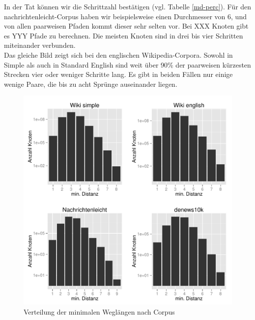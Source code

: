 \documentclass[11pt, a4paper]{article}
\begin{document}
In der Tat können wir die Schrittzahl bestätigen (vgl. Tabelle \ref{md-perc}).
Für den nachrichtenleicht-Corpus haben wir beispielsweise einen Durchmesser von
6, und von %
allen paarweisen Pfaden kommt dieser sehr selten vor. Bei XXX Knoten gibt
es YYY Pfade zu berechnen. Die meisten Knoten sind in drei bis vier Schritten
miteinander verbunden.\\
Das gleiche Bild zeigt sich bei den englischen Wikipedia-Corpora. Sowohl in 
Simple als auch in Standard English sind weit über 90\% der paarweisen
kürzesten Strecken vier oder weniger Schritte lang. Es gibt in beiden Fällen nur
einige wenige Paare, die bis zu acht Sprünge auseinander liegen.

\begin{figure}[ht]
    \centering
        \includegraphics[scale=.75]{mdh_plots.pdf}
    \caption{Verteilung der minimalen Weglängen nach Corpus}
    \label{fig-mdh}
\end{figure}
\end{document}
